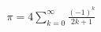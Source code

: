 \documentclass[preview]{standalone}
\begin{document}
\begin{align*}
\pi = 4 \sum_{k=0}^{\infty} \frac{(-1)^k}{2k+1}
\end{align*}
\end{document}
